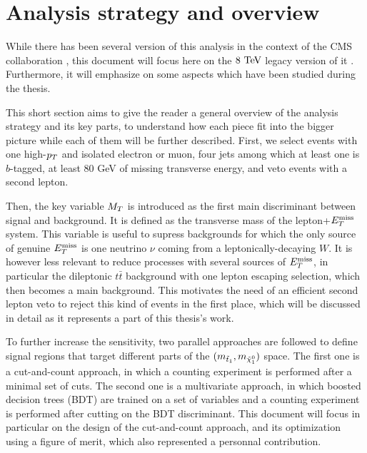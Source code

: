     \section{Analysis strategy and overview \label{sec:analysis_overview}}

    While there has been several version of this analysis in the context of the CMS
    collaboration \cite{SUS-12-023-PAS, SUS-13-011-PUB, SUS-14-015-PAS}, this document
    will focus here on the $8~\text{TeV}$ legacy version of it \cite{SUS-14-015-PAS}. Furthermore,
    it will emphasize on some aspects which have been studied during the thesis.

    This short section aims to give the reader a general overview of the analysis strategy
    and its key parts, to understand how each piece fit into the bigger picture while each
    of them will be further described. First, we  select
    events with one high-$p_T$ and isolated electron or muon, four jets among which at least one is
    $b$-tagged, at least 80 GeV of missing transverse energy, and veto events with a second
    lepton.

    Then, the key variable $M_T$ is introduced as the first main discriminant between signal
    and background. It is defined as the transverse mass of the lepton+$E_T^\text{miss}$ system. This
    variable is useful to supress backgrounds for which the only source of genuine $E_T^\text{miss}$ is
    one neutrino $\nu$ coming from a leptonically-decaying $W$. It is however less relevant
    to reduce processes with several sources of $E_T^\text{miss}$, in particular the dileptonic $t\bar{t}$
    background with one lepton escaping selection, which then becomes a main background. This
    motivates the need of an efficient second lepton veto to reject this kind of events in the
    first place, which will be discussed in detail as it represents a part of this thesis's work.

    To further increase the sensitivity, two parallel approaches are followed to define
    signal regions that target different parts of the $(m_{\tilde{t}_1},m_{\tilde{\chi}_1^0})$
    space. The first one is a cut-and-count approach, in which a counting experiment is performed
    after a minimal set of cuts. The second one is a multivariate approach, in which boosted
    decision trees (BDT) are trained on a set of variables and a counting experiment is performed
    after cutting on the BDT discriminant. This document will focus in particular on the design
    of the cut-and-count approach, and its optimization using a figure of merit, which
    also represented a personnal contribution.

